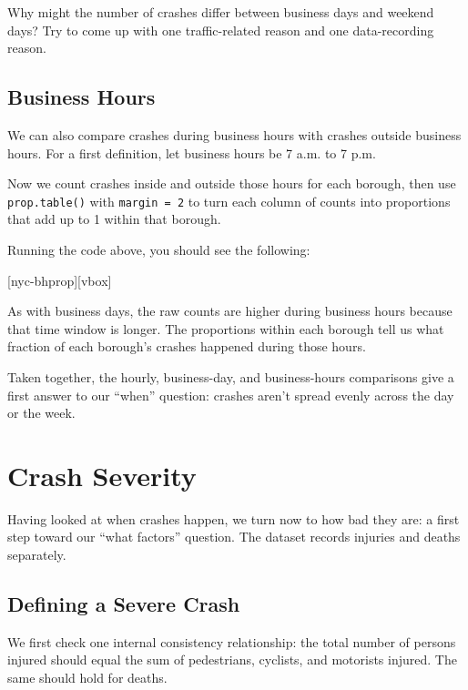Why might the number of crashes differ between business days and
weekend days? Try to come up with one traffic-related reason and one
data-recording reason.

\subsection{Business Hours}

We can also compare crashes during business hours with crashes outside
business hours. For a first definition, let business hours be 7 a.m. to
7 p.m.


Now we count crashes inside and outside those hours for each borough,
then use \lstinline{prop.table()} with \lstinline{margin = 2} to turn
each column of counts into proportions that add up to 1 within that
borough.


Running the code above, you should see the following:

[nyc-bhprop][vbox]

As with business days,  the raw counts are higher during business hours
because that time window is longer. The proportions within each borough
tell us what fraction of each borough's crashes happened during those
hours.

Taken together, the hourly, business-day, and business-hours comparisons
give a first answer to our ``when'' question: crashes aren't spread
evenly across the day or the week.

\section{Crash Severity}

Having looked at when crashes happen, we turn now to how bad they
are: a first step toward our  ``what factors'' question. The dataset
records injuries and deaths separately.

\subsection{Defining a Severe Crash}

We first check one internal consistency
relationship: the total number of persons injured should equal the
sum of pedestrians, cyclists, and motorists injured. The same should
hold for deaths.

